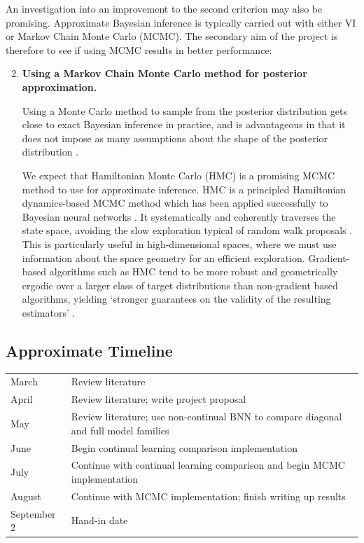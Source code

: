 \documentclass[a4paper,10pt]{article}
\begin{document}
\vspace{0.5em}
An investigation into an improvement to the second criterion may also be promising. Approximate Bayesian inference is typically carried out with either VI or Markov Chain Monte Carlo (MCMC). The secondary aim of the project is therefore to see if using MCMC results in better performance:
\begin{enumerate}
\setcounter{enumi}{1}
\item \textbf{Using a Markov Chain Monte Carlo method for posterior approximation.}

Using a Monte Carlo method to sample from the posterior distribution gets close to exact Bayesian inference in practice, and is advantageous in that it does not impose as many assumptions about the shape of the posterior distribution \cite{hinton}.

We expect that Hamiltonian Monte Carlo (HMC) is a promising MCMC method to use for approximate inference. HMC is a principled Hamiltonian dynamics-based MCMC method which has been applied successfully to Bayesian neural networks \cite{neal1995}. It systematically and coherently traverses the state space, avoiding the slow exploration typical of random walk proposals \cite{neal2012}. This is particularly useful in high-dimensional spaces, where we must use information about the space geometry for an efficient exploration. Gradient-based algorithms such as HMC tend to be more robust and geometrically ergodic over a larger class of target distributions than non-gradient based algorithms, yielding `stronger guarantees on the validity of the resulting estimators' \cite{betancourt}.
\end{enumerate}


\subsection*{Approximate Timeline}

\begin{tabular}{l|l}
\hline
March 	& Review literature\\
April	& Review literature; write project proposal\\
May		& Review literature; use non-continual BNN to compare diagonal and full model families\\ %
June 	& Begin continual learning comparison implementation\\
July	& Continue with continual learning comparison and begin MCMC implementation \\
August	& Continue with MCMC implementation; finish writing up results\\%
September 2 & Hand-in date\\
\hline
\end{tabular}
\end{document}
